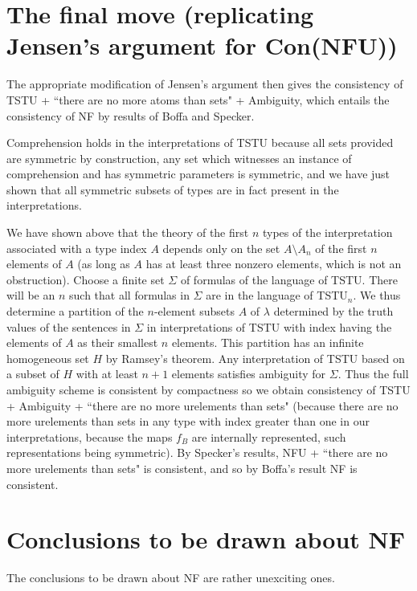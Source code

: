 \documentclass{article}
\begin{document}
\newpage

\section{The final move (replicating Jensen's argument for Con(NFU))}

The appropriate modification of Jensen's argument then gives the consistency of TSTU + ``there are no more atoms than sets" + Ambiguity, which entails the consistency of NF by results of Boffa and Specker.

Comprehension holds in the interpretations of TSTU because all sets provided are symmetric by construction, any set which witnesses an instance of comprehension and has symmetric parameters is symmetric, and we have just shown that all symmetric subsets of types are in fact present in the interpretations.

We have shown above that the theory of the first $n$ types of the interpretation associated with a type index $A$ depends only on the set $A \setminus A_n$ of the first
$n$ elements of $A$ (as long as $A$ has at least three nonzero elements, which is not an obstruction).   Choose a finite set $\Sigma$ of formulas of the language of TSTU.  There will be an $n$ such that all formulas in $\Sigma$ are in the language of
TSTU$_n$.  We thus determine a partition of the $n$-element subsets $A$ of $\lambda$ determined by the truth values of the sentences in $\Sigma$ in interpretations
of TSTU with index having the elements of $A$ as their smallest $n$ elements.   This partition has an infinite homogeneous set $H$ by Ramsey's theorem.   Any interpretation of TSTU based on a subset
of $H$ with at least $n+1$ elements satisfies ambiguity for $\Sigma$.   Thus the full ambiguity scheme is consistent by compactness so we obtain consistency of
TSTU + Ambiguity + ``there are no more urelements than sets" (because there are no more urelements than sets in any type with index greater than one in our interpretations, because the maps $f_B$ are internally represented, such representations being symmetric).   By Specker's results, NFU + ``there are no more urelements than sets" is consistent,
and so by Boffa's result NF is consistent.

\newpage

\section{Conclusions to be drawn about NF}

The conclusions to be drawn about NF are rather unexciting ones.
\end{document}
